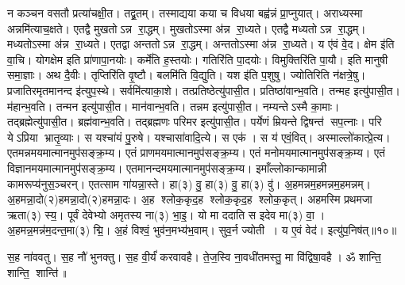 न कञ्चन वसतौ प्रत्या॑चक्षी॒त। तद्व्र॒तम्। तस्माद्यया कया च विधया बह्व॑न्नं प्रा॒प्नुयात्। अराध्यस्मा अन्नमि॑त्याच॒क्षते। एतद्वै मुखतोऽन्न रा॒द्धम्। मुखतोऽस्मा अ॑न्न रा॒ध्यते। एतद्वै मध्यतोऽन्न रा॒द्धम्। मध्यतोऽस्मा अ॑न्न रा॒ध्यते। एतद्वा अन्ततोऽन्न रा॒द्धम्। अन्ततोऽस्मा अ॑न्न रा॒ध्यते। य ए॑वं वे॒द। क्षेम इ॑ति वा॒चि। योगक्षेम इति प्रा॑णापा॒नयोः। कर्मे॑ति ह॒स्तयोः। गतिरि॑ति पा॒दयोः। विमुक्तिरि॑ति पा॒यौ। इति मानुषी समा॒ज्ञाः। अथ दै॒वीः। तृप्तिरि॑ति वृ॒ष्टौ। बलमि॑ति वि॒द्युति। यश इ॑ति प॒शुषु। ज्योतिरिति न॑क्षत्रे॒षु। प्रजातिरमृतमानन्द इ॑त्युप॒स्थे। सर्वमि॑त्याका॒शे। तत्प्रतिष्ठेत्यु॑पासी॒त। प्रतिष्ठा॑वान्भ॒वति। तन्मह इत्यु॑पासी॒त। म॑हान्भ॒वति। तन्मन इत्यु॑पासी॒त। मान॑वान्भ॒वति। तन्नम इत्यु॑पासी॒त। नम्यन्तेऽस्मै का॒माः। तद्ब्रह्मेत्यु॑पासी॒त। ब्रह्म॑वान्भ॒वति। तद्ब्रह्मणः परिमर इत्यु॑पासी॒त। पर्येणं म्रियन्ते द्विषन्त॑ सप॒त्नाः। परि येऽप्रिया भ्रातृ॒व्याः। स यश्चा॑यं पु॒रुषे। यश्चासा॑वादि॒त्ये। स एक॑। स य॑ एवं॒वित्। अस्माल्लो॑कात्प्रे॒त्य। एतमन्नमयमात्मानमुप॑सङ्क्र॒म्य। एतं प्राणमयमात्मानमुप॑सङ्क्र॒म्य। एतं मनोमयमात्मानमुप॑\-सङ्क्र॒म्य। एतं विज्ञानमयमात्मानमुप॑\-सङ्क्र॒म्य। एतमानन्दमय\-मात्मानमुप॑सङ्क्र॒म्य। इमाँल्लोकान्कामान्नी कामरूप्य॑नु\-स॒ञ्चरन्। एतत्साम गा॑यन्ना॒स्ते। हा(३) वु॒ हा(३) वु॒ हा(३) वु॑। अ॒हमन्नम॒हमन्नम॒हमन्नम्। अ॒हमन्ना॒दो(२)\-\aav{}हमन्ना॒दो(२)\-\aav{}हमन्ना॒दः। अ॒ह श्लोक॒कृद॒ह श्लोक॒कृद॒ह श्लोक॒कृत्। अहमस्मि प्रथमजा ऋता(३) स्य॒। पूर्वं देवेभ्यो अमृतस्य ना(३) भा॒इ॒। यो मा ददाति स इदेव मा(३) वा॒। अ॒हमन्न॒मन्न॑म॒दन्त॒मा(३) द्मि॒। अ॒हं  विश्वं॒ भुव॑न॒मभ्य॑भ॒वाम्। सुव॒र्न ज्योती। य ए॒वं वेद॑। इत्यु॑प॒निष॑त्॥१०॥

स॒ह ना॑ववतु। स॒ह नौ॑ भुनक्तु। स॒ह वी॒र्यं॑ करवावहै। ते॒ज॒स्वि ना॒वधी॑तमस्तु॒ मा वि॑द्विषा॒वहै। ॐ शान्ति॒ शान्ति॒ शान्ति॑॥

\closesection



